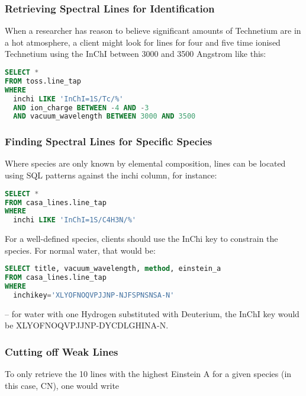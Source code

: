 \documentclass[11pt,a4paper]{ivoa}
\begin{document}
\subsubsection{Retrieving Spectral Lines for Identification}

When a researcher has reason to believe significant amounts of
Technetium are in a hot atmosphere, a client might look for lines for
four and five time ionised Technetium using the InChI between 3000 and
3500 Angstrom like this:

\begin{lstlisting}[language=SQL]
SELECT *
FROM toss.line_tap
WHERE
  inchi LIKE 'InChI=1S/Tc/%'
  AND ion_charge BETWEEN -4 AND -3
  AND vacuum_wavelength BETWEEN 3000 AND 3500
\end{lstlisting}


\subsubsection{Finding Spectral Lines for Specific Species}

Where species are only known by elemental composition, lines can be
located using SQL patterns against the inchi column, for instance:

\begin{lstlisting}[language=SQL]
SELECT *
FROM casa_lines.line_tap
WHERE
  inchi LIKE 'InChI=1S/C4H3N/%'
\end{lstlisting}

For a well-defined species, clients should use the InChi key to
constrain the species.  For
normal water, that would be:

\begin{lstlisting}[language=SQL]
SELECT title, vacuum_wavelength, method, einstein_a
FROM casa_lines.line_tap
WHERE
  inchikey='XLYOFNOQVPJJNP-NJFSPNSNSA-N'
\end{lstlisting}

-- for water with one Hydrogen substituted with Deuterium, the InChI key
would be XLYOFNOQVPJJNP-DYCDLGHINA-N.

\subsubsection{Cutting off Weak Lines}

To only retrieve the 10 lines with the highest Einstein A for a given
species (in this case, CN), one would write
\end{document}
